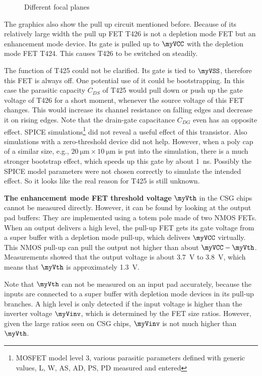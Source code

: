 \begin{figure}[htbp]
    \centering
    \caption{Different focal planes}
    \label{fig:focal-planes}
\end{figure}

The graphics also show the pull up circuit mentioned before. Because of its
relatively large width the pull up FET T426 is not a depletion mode FET but
an enhancement mode device. Its gate is pulled up to $\myVCC$ with the
depletion mode FET T424. This causes T426 to be switched on steadily.

The function of T425 could not be clarified. Its gate is tied to $\myVSS$,
therefore this FET is always off. One potential use of it could be
bootstrapping. In this case the parasitic capacity $C_{DS}$ of T425 would
pull down or push up the gate voltage of T426 for a short moment, whenever
the source voltage of this FET changes. This would increase its channel
resistance on falling edges and decrease it on rising edges. Note that the
drain-gate capacitance $C_{DG}$ even has an opposite effect. SPICE
simulations\footnote {MOSFET model level 3, various parasitic parameters
defined with generic values, L, W, AS, AD, PS, PD measured and entered} did
not reveal a useful effect of this transistor. Also simulations with a
zero-threshold device did not help. However, when a poly cap of a similar
size, e.g., $\SI{20}{\micro\meter} \times \SI{10}{\micro\meter}$ is put into
the simulation, there is a much stronger bootstrap effect, which speeds up
this gate by about \SI{1}{\nano\second}. Possibly the SPICE model
parameters were not chosen correctly to simulate the intended effect. So it
looks like the real reason for T425 is still unknown.

\begin{mytextframe}{.9\textwidth}
\textbf{The enhancement mode FET threshold voltage} $\myVth$ in the CSG chips
cannot be measured directly. However, it can be found by looking at the
output pad buffers: They are implemented using a totem pole made of two NMOS
FETs. When an output delivers a high level, the pull-up FET gets its gate
voltage from a super buffer with a depletion mode pull-up, which delivers
$\myVCC$ virtually. This NMOS pull-up can pull the output not higher than about
$\myVCC - \myVth$. Measurements showed that the output voltage is about
\SI{3.7}{\volt} to \SI{3.8}{\volt}, which means that $\myVth$ is
approximately \SI{1.3}{\volt}.


Note that $\myVth$ can not be measured on an input pad accurately, because
the inputs are connected to a super buffer with depletion mode devices in its
pull-up branches. A high level is only detected if the input voltage is
higher than the inverter voltage $\myVinv$, which is determined by the FET
size ratios. However, given the large ratios seen on CSG chips, $\myVinv$ is
not much higher than $\myVth$.
\end{mytextframe}

